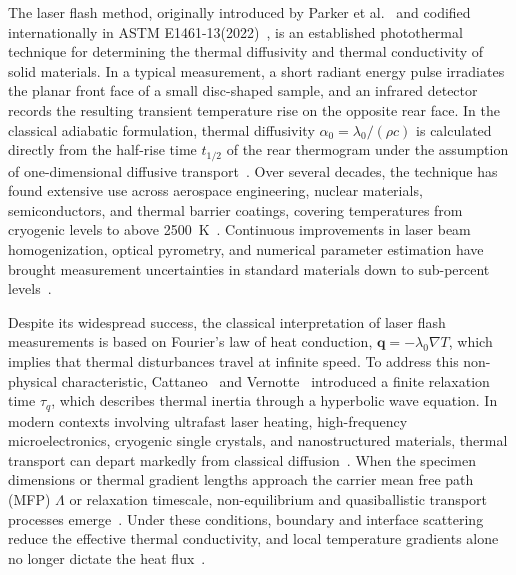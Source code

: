 \documentclass[preprint,12pt]{elsarticle}
\begin{document}
The laser flash method, originally introduced by Parker et al.~\cite{parker1961flash} and codified internationally in ASTM E1461-13(2022)~\cite{astm2022standard}, is an established photothermal technique for determining the thermal diffusivity and thermal conductivity of solid materials. In a typical measurement, a short radiant energy pulse irradiates the planar front face of a small disc-shaped sample, and an infrared detector records the resulting transient temperature rise on the opposite rear face. In the classical adiabatic formulation, thermal diffusivity $\alpha_0 = \lambda_0 / (\rho c)$ is calculated directly from the half-rise time $t_{1/2}$ of the rear thermogram under the assumption of one-dimensional diffusive transport~\cite{parker1961flash}. Over several decades, the technique has found extensive use across aerospace engineering, nuclear materials, semiconductors, and thermal barrier coatings, covering temperatures from cryogenic levels to above 2500~K~\cite{blumm2025laser,vozar2004flash}. Continuous improvements in laser beam homogenization, optical pyrometry, and numerical parameter estimation have brought measurement uncertainties in standard materials down to sub-percent levels~\cite{blumm2002improvement}.

Despite its widespread success, the classical interpretation of laser flash measurements is based on Fourier's law of heat conduction, $\bm{q} = -\lambda_0 \nabla T$, which implies that thermal disturbances travel at infinite speed. To address this non-physical characteristic, Cattaneo~\cite{cattaneo1958forme} and Vernotte~\cite{vernotte1958paradoxes} introduced a finite relaxation time $\tau_q$, which describes thermal inertia through a hyperbolic wave equation. In modern contexts involving ultrafast laser heating, high-frequency microelectronics, cryogenic single crystals, and nanostructured materials, thermal transport can depart markedly from classical diffusion~\cite{cahill2003nanoscale}. When the specimen dimensions or thermal gradient lengths approach the carrier mean free path (MFP) $\Lambda$ or relaxation timescale, non-equilibrium and quasiballistic transport processes emerge~\cite{chen2001ballistic}. Under these conditions, boundary and interface scattering reduce the effective thermal conductivity, and local temperature gradients alone no longer dictate the heat flux~\cite{alvarez2007memory,guo2015phonon}.
\end{document}

